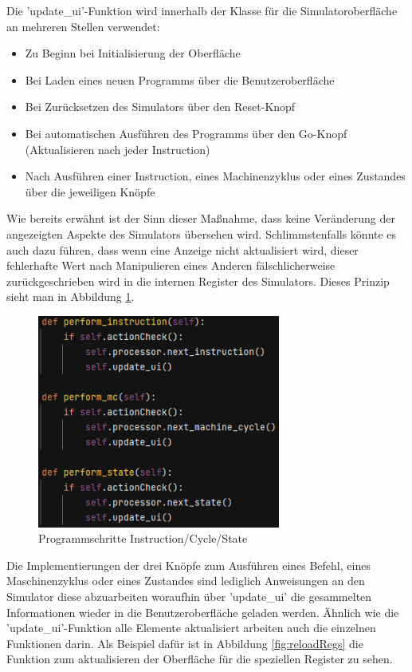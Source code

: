 \documentclass[12pt]{article}
\newcommand{\imgSpaceBefore}{\vspace{10pt}}
\begin{document}
\noindent
Die 'update\_ui'-Funktion wird innerhalb der Klasse für die Simulatoroberfläche an mehreren Stellen verwendet:\imgSpaceBefore

\begin{itemize}
	\item Zu Beginn bei Initialisierung der Oberfläche
	\item Bei Laden eines neuen Programms über die Benutzeroberfläche
	\item Bei Zurücksetzen des Simulators über den Reset-Knopf
	\item Bei automatischen Ausführen des Programms über den Go-Knopf (Aktualisieren nach jeder Instruction)
	\item Nach Ausführen einer Instruction, eines Machinenzyklus oder eines Zustandes über die jeweiligen Knöpfe
\end{itemize}

\noindent
Wie bereits erwähnt ist der Sinn dieser Maßnahme, dass keine Veränderung der angezeigten Aspekte des Simulators übersehen wird. Schlimmstenfalls könnte es auch dazu führen, dass wenn eine Anzeige nicht aktualisiert wird, dieser fehlerhafte Wert nach Manipulieren eines Anderen fälschlicherweise zurückgeschrieben wird in die internen Register des Simulators. Dieses Prinzip sieht man in Abbildung \ref{fig:perf}.\imgSpaceBefore

\begin{figure}[H]
\centering
\includegraphics[width=8cm]{bilder/Perform}
\caption{Programmschritte Instruction/Cycle/State}
\label{fig:perf}
\end{figure}

\noindent
Die Implementierungen der drei Knöpfe zum Ausführen eines Befehl, eines Maschinenzyklus oder eines Zustandes sind lediglich Anweisungen an den Simulator diese abzuarbeiten woraufhin über 'update\_ui' die gesammelten Informationen wieder in die Benutzeroberfläche geladen werden. Ähnlich wie die 'update\_ui'-Funktion alle Elemente aktualisiert arbeiten auch die einzelnen Funktionen darin. Als Beispiel dafür ist in Abbildung \ref{fig:reloadRegs} die Funktion zum aktualisieren der Oberfläche für die speziellen Register zu sehen.\imgSpaceBefore
\end{document}

